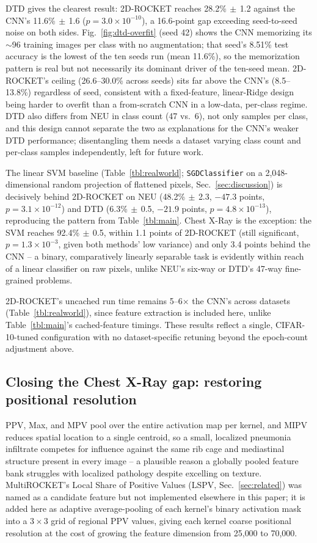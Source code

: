 \documentclass[a4paper,fleqn]{cas-sc}
\newcommand{\std}[1]{$\,\pm\,$#1}
\begin{document}
DTD gives the clearest result: 2D-ROCKET reaches 28.2\%\std{1.2} against the CNN's 11.6\%\std{1.6} ($p=3.0\times10^{-10}$), a 16.6-point gap exceeding seed-to-seed noise on both sides. Fig.~\ref{fig:dtd-overfit} (seed 42) shows the CNN memorizing its $\sim$96 training images per class with no augmentation; that seed's 8.51\% test accuracy is the lowest of the ten seeds run (mean 11.6\%), so the memorization pattern is real but not necessarily its dominant driver of the ten-seed mean. 2D-ROCKET's ceiling (26.6--30.0\% across seeds) sits far above the CNN's (8.5--13.8\%) regardless of seed, consistent with a fixed-feature, linear-Ridge design being harder to overfit than a from-scratch CNN in a low-data, per-class regime. DTD also differs from NEU in class count (47 vs.\ 6), not only samples per class, and this design cannot separate the two as explanations for the CNN's weaker DTD performance; disentangling them needs a dataset varying class count and per-class samples independently, left for future work.

The linear SVM baseline (Table~\ref{tbl:realworld}; \texttt{SGDClassifier} on a 2,048-dimensional random projection of flattened pixels, Sec.~\ref{sec:discussion}) is decisively behind 2D-ROCKET on NEU (48.2\%\std{2.3}, $-47.3$ points, $p=3.1\times10^{-12}$) and DTD (6.3\%\std{0.5}, $-21.9$ points, $p=4.8\times10^{-13}$), reproducing the pattern from Table~\ref{tbl:main}. Chest X-Ray is the exception: the SVM reaches 92.4\%\std{0.5}, within 1.1 points of 2D-ROCKET (still significant, $p=1.3\times10^{-3}$, given both methods' low variance) and only 3.4 points behind the CNN -- a binary, comparatively linearly separable task is evidently within reach of a linear classifier on raw pixels, unlike NEU's six-way or DTD's 47-way fine-grained problems.

2D-ROCKET's uncached run time remains 5--6$\times$ the CNN's across datasets (Table~\ref{tbl:realworld}), since feature extraction is included here, unlike Table~\ref{tbl:main}'s cached-feature timings. These results reflect a single, CIFAR-10-tuned configuration with no dataset-specific retuning beyond the epoch-count adjustment above.

\subsection{Closing the Chest X-Ray gap: restoring positional resolution}\label{sec:lspv}

PPV, Max, and MPV pool over the entire activation map per kernel, and MIPV reduces spatial location to a single centroid, so a small, localized pneumonia infiltrate competes for influence against the same rib cage and mediastinal structure present in every image -- a plausible reason a globally pooled feature bank struggles with localized pathology despite excelling on texture. MultiROCKET's Local Share of Positive Values (LSPV, Sec.~\ref{sec:related}) was named as a candidate feature but not implemented elsewhere in this paper; it is added here as adaptive average-pooling of each kernel's binary activation mask into a $3\times3$ grid of regional PPV values, giving each kernel coarse positional resolution at the cost of growing the feature dimension from 25{,}000 to 70{,}000.
\end{document}
